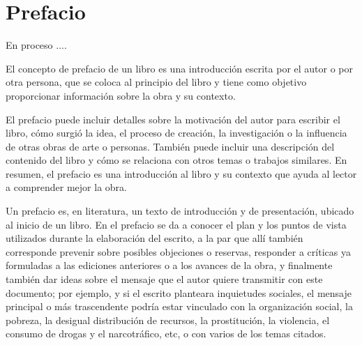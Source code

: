 




























\chapter*{Prefacio}	



En proceso .... 


El concepto de prefacio de un libro es una introducción escrita por el autor o por otra persona, que se coloca al principio del libro y tiene como objetivo proporcionar información sobre la obra y su contexto. 

El prefacio puede incluir detalles sobre la motivación del autor para escribir el libro, cómo surgió la idea, el proceso de creación, la investigación o la influencia de otras obras de arte o personas. También puede incluir una descripción del contenido del libro y cómo se relaciona con otros temas o trabajos similares. En resumen, el prefacio es una introducción al libro y su contexto que ayuda al lector a comprender mejor la obra.

Un prefacio es, en literatura, un texto de introducción y de presentación, ubicado al inicio de un libro. En el prefacio se da a conocer el plan y los puntos de vista utilizados durante la elaboración del escrito, a la par que allí también corresponde prevenir sobre posibles objeciones o reservas, responder a críticas ya formuladas a las ediciones anteriores o a los avances de la obra, y finalmente también dar ideas sobre el mensaje que el autor quiere transmitir con este documento; por ejemplo, y si el escrito planteara inquietudes sociales, el mensaje principal o más trascendente podría estar vinculado con la organización social, la pobreza, la desigual distribución de recursos, la prostitución, la violencia, el consumo de drogas y el narcotráfico, etc, o con varios de los temas citados.

